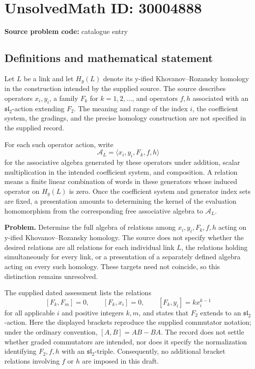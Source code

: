 \documentclass[11pt]{article}
\begin{document}
\section*{UnsolvedMath ID: 30004888}
\textbf{Source problem code:} catalogue entry
\subsection{Definitions and mathematical statement}
Let \(L\) be a link and let \(H_y(L)\) denote its y-ified Khovanov--Rozansky homology in the construction intended by the supplied source. The source describes operators \(x_i,y_i\), a family \(F_k\) for \(k=1,2,\ldots\), and operators \(f,h\) associated with an \(\mathfrak{sl}_2\)-action extending \(F_2\). The meaning and range of the index \(i\), the coefficient system, the gradings, and the precise homology construction are not specified in the supplied record.

For each such operator action, write
\[
\mathcal A_L=\bigl\langle x_i,y_i,F_k,f,h\bigr\rangle
\]
for the associative algebra generated by these operators under addition, scalar multiplication in the intended coefficient system, and composition. A relation means a finite linear combination of words in these generators whose induced operator on \(H_y(L)\) is zero. Once the coefficient system and generator index sets are fixed, a presentation amounts to determining the kernel of the evaluation homomorphism from the corresponding free associative algebra to \(\mathcal A_L\).

\textbf{Problem.} Determine the full algebra of relations among \(x_i,y_i,F_k,f,h\) acting on y-ified Khovanov--Rozansky homology. The source does not specify whether the desired relations are all relations for each individual link \(L\), the relations holding simultaneously for every link, or a presentation of a separately defined algebra acting on every such homology. These targets need not coincide, so this distinction remains unresolved.

The supplied dated assessment lists the relations
\[
[F_k,F_m]=0,\qquad [F_k,x_i]=0,\qquad
[F_k,y_i]=k x_i^{k-1}
\]
for all applicable \(i\) and positive integers \(k,m\), and states that \(F_2\) extends to an \(\mathfrak{sl}_2\)-action. Here the displayed brackets reproduce the supplied commutator notation; under the ordinary convention, \([A,B]=AB-BA\). The record does not settle whether graded commutators are intended, nor does it specify the normalization identifying \(F_2,f,h\) with an \(\mathfrak{sl}_2\)-triple. Consequently, no additional bracket relations involving \(f\) or \(h\) are imposed in this draft.
\end{document}
